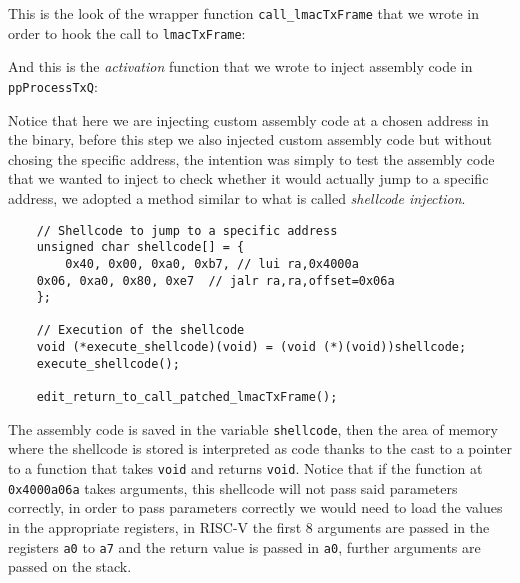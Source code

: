 \usebox\funprocesstxq

This is the look of the wrapper function \texttt{call\_lmacTxFrame} that we wrote in order
to hook the call to \texttt{lmacTxFrame}:

\usebox\funcalllmactxframe

And this is the \textit{activation} function that we wrote to inject assembly code in \texttt{ppProcessTxQ}:

\usebox\funactivation


Notice that here we are injecting custom assembly code at a chosen address in the binary,
before this step we also injected custom assembly code but without chosing the specific address,
the intention was simply to test the assembly code that we wanted to inject to check whether it would
actually jump to a specific address, we adopted a method similar to what is called \textit{shellcode injection}.
\newsavebox\shellcode
\begin{lrbox}{\shellcode}
\begin{lstlisting}
    // Shellcode to jump to a specific address
    unsigned char shellcode[] = { 
        0x40, 0x00, 0xa0, 0xb7, // lui ra,0x4000a
	0x06, 0xa0, 0x80, 0xe7  // jalr ra,ra,offset=0x06a
    };

    // Execution of the shellcode
    void (*execute_shellcode)(void) = (void (*)(void))shellcode;
    execute_shellcode();

    edit_return_to_call_patched_lmacTxFrame();
\end{lstlisting}
\end{lrbox}

\usebox\shellcode

The assembly code is saved in the variable \texttt{shellcode}, then the area of memory where the
shellcode is stored is interpreted as code thanks to the cast to a pointer to a function that
takes \texttt{void} and returns \texttt{void}. Notice that if the function at 
\texttt{0x4000a06a} takes arguments, this shellcode will not pass said parameters correctly,
in order to pass parameters correctly we would need to load the values in the appropriate registers,
in RISC-V the first 8 arguments are passed in the registers \texttt{a0} to \texttt{a7} and 
the return value is passed in \texttt{a0}, further arguments are passed on the stack.

